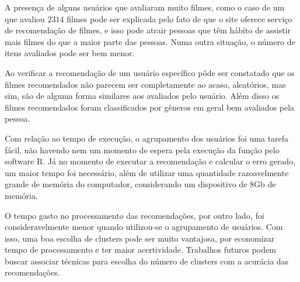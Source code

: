 \documentclass[12pt,a4paper,header]{abnt}
\begin{document}
A presença de alguns usuários que avaliaram muito filmes, como o caso de um que avaliou $2314$ filmes pode ser explicada pelo fato de que o site oferece serviço de recomendação de filmes, e isso pode atrair pessoas que têm hábito de assistir mais filmes do que a maior parte das pessoas. Numa outra situação, o número de itens avaliados pode ser bem menor.

Ao verificar a recomendação de um usuário específico pôde ser constatado que os filmes recomendados não parecem ser completamente ao acaso, aleatórios, mas sim, são de alguma forma similares aos avaliados pelo usuário. Além disso os filmes recomendados foram classificados por gêneros em geral bem avaliados pela pessoa.

Com relação ao tempo de execução, o agrupamento dos usuários foi uma tarefa fácil, não havendo nem um momento de espera pela execução da função pelo software R. Já no momento de executar a recomendação e calcular o erro gerado, um maior tempo foi necessário, além de utilizar uma quantidade razoavelmente grande de memória do computador, considerando um dispositivo de $8$Gb de memória.

O tempo gasto no processamento das recomendações, por outro lado, foi consideravelmente menor quando utilizou-se o agrupamento de usuários. Com isso, uma boa escolha de clusters pode ser muito vantajosa, por economizar tempo de processamento e ter maior acertividade. Trabalhos futuros podem buscar associar técnicas para escolha do número de clusters com a acurácia das recomendações.




\anexo








\end{document}
